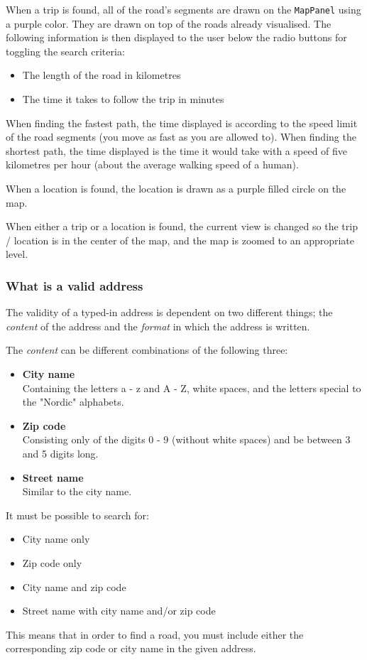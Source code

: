 When a trip is found, all of the road's segments are drawn on the \texttt{MapPanel} using a purple color. They are drawn on top of the roads already visualised. The following information is then displayed to the user below the radio buttons for toggling the search criteria:
\begin{itemize}
	\item The length of the road in kilometres
	\item The time it takes to follow the trip in minutes
\end{itemize}
When finding the fastest path, the time displayed is according to the speed limit of the road segments (you move as fast as you are allowed to). When finding the shortest path, the time displayed is the time it would take with a speed of five kilometres per hour (about the average walking speed of a human).

When a location is found, the location is drawn as a purple filled circle on the map.

When either a trip or a location is found, the current view is changed so the trip / location is in the center of the map, and the map is zoomed to an appropriate level.

\subsubsection{What is a valid address}
\label{sec: What is a valid address}
\label{sec:What is a valid address}
The validity of a typed-in address is dependent on two different things; the \textit{content} of the address and the \textit{format} in which the address is written.

The \textit{content} can be different combinations of the following three:
\begin{itemize}
	\item \textbf{City name} \\
		Containing the letters a - z and A - Z, white spaces, and the letters special to the "Nordic" alphabets.
	\item \textbf{Zip code} \\
		Consisting only of the digits 0 - 9 (without white spaces) and be between 3 and 5 digits long.
	\item \textbf{Street name} \\
		Similar to the city name.
\end{itemize}
It must be possible to search for:
\begin{itemize}
	\item City name only
	\item Zip code only
	\item City name and zip code
	\item Street name with city name and/or zip code
\end{itemize}
This means that in order to find a road, you must include either the corresponding zip code or city name in the given address.

